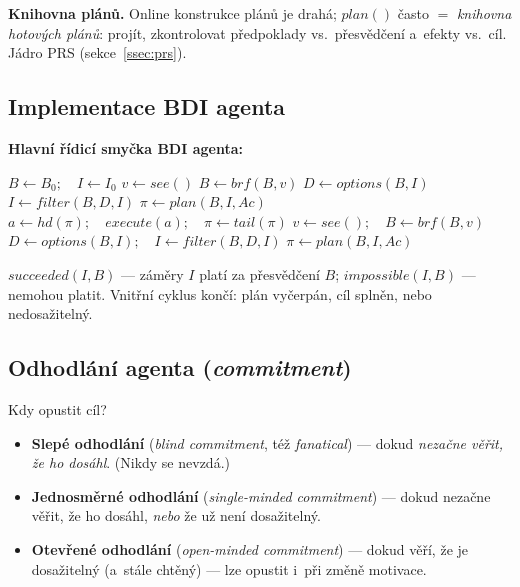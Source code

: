 \documentclass[11pt,a4paper]{article}
\theoremstyle{definition}
\begin{document}
\textbf{Knihovna plánů.} Online konstrukce plánů je drahá; $\mathit{plan}()$ často $=$
\emph{knihovna hotových plánů}: projít, zkontrolovat předpoklady vs.\ přesvědčení a~efekty vs.\
cíl. Jádro PRS (sekce~\ref{ssec:prs}).

\subsection{Implementace BDI agenta}

\noindent\textbf{Hlavní řídicí smyčka BDI agenta:}
\begin{algorithmic}[1]
\State $B \gets B_0;\quad I \gets I_0$
  \State $v \gets \mathit{see}()$
  \State $B \gets \mathit{brf}(B,v)$
  \State $D \gets \mathit{options}(B,I)$
  \State $I \gets \mathit{filter}(B,D,I)$
  \State $\pi \gets \mathit{plan}(B,I,\mathit{Ac})$
    \State $a \gets \mathit{hd}(\pi);\quad \mathit{execute}(a);\quad \pi \gets \mathit{tail}(\pi)$
    \State $v \gets \mathit{see}();\quad B \gets \mathit{brf}(B,v)$
    \If{$\mathit{reconsider}(I,B)$}
      \State $D \gets \mathit{options}(B,I);\quad I \gets \mathit{filter}(B,D,I)$
    \EndIf
      \State $\pi \gets \mathit{plan}(B,I,\mathit{Ac})$ 
    \EndIf
  \EndWhile
\EndWhile
\end{algorithmic}

$\mathit{succeeded}(I,B)$ --- záměry $I$ platí za přesvědčení $B$;
$\mathit{impossible}(I,B)$ --- nemohou platit. Vnitřní cyklus končí: plán vyčerpán, cíl splněn,
nebo nedosažitelný.

\subsection{Odhodlání agenta (\emph{commitment})}
\label{ssec:commitment}

\begin{defbox}
Kdy opustit cíl?
\begin{itemize}
\item \textbf{Slepé odhodlání} (\emph{blind commitment}, též \emph{fanatical}) --- dokud
  \emph{nezačne věřit, že ho dosáhl}. (Nikdy se nevzdá.)
\item \textbf{Jednosměrné odhodlání} (\emph{single-minded commitment}) --- dokud nezačne věřit,
  že ho dosáhl, \emph{nebo} že už není dosažitelný.
\item \textbf{Otevřené odhodlání} (\emph{open-minded commitment}) --- dokud věří, že je
  dosažitelný (a~stále chtěný) --- lze opustit i~při změně motivace.
\end{itemize}
\end{defbox}
\end{document}
